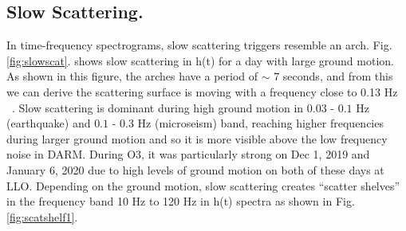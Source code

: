 \documentclass[12pt]{iopart}
\begin{document}
\subsection{Slow Scattering.}
In time-frequency spectrograms, slow scattering triggers resemble an arch.  Fig. \ref{fig:slowscat}. shows slow scattering in h(t) for a day with large ground motion. As shown in this figure, the arches have a period of $\sim$ 7 seconds, and from this we can derive the scattering surface is moving with a frequency close to 0.13 Hz ~\cite{alogsid}. 
Slow scattering is  dominant during high ground motion in $0.03$ - $0.1$ Hz (earthquake) and $0.1$ - $0.3$  Hz (microseism) band, reaching higher frequencies during larger ground motion and so it is more visible above the low frequency noise in DARM. During O3, it was particularly strong on Dec 1, 2019 and January 6, 2020 due to high levels of ground motion on both of these days at LLO.  Depending on the ground motion, slow scattering creates ``scatter shelves'' in the frequency band 10 Hz to 120 Hz in h(t) spectra as shown in Fig. \ref{fig:scatshelf1}.



         
    
    
\end{document}
